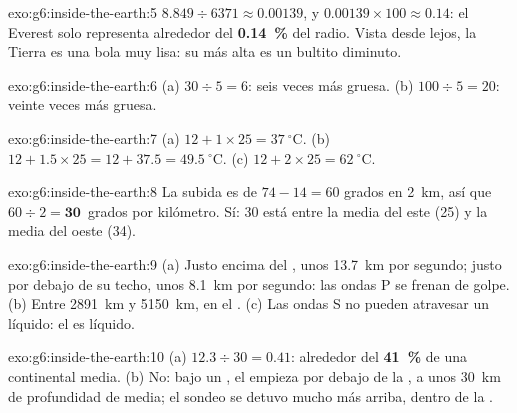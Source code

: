 \begin{solution}{exo:g6:inside-the-earth:5}
$8.849 \div 6371 \approx 0.00139$, y $0.00139 \times 100 \approx 0.14$: el
Everest solo representa alrededor del \textbf{0.14~\%} del radio. Vista
desde lejos, la Tierra es una bola muy lisa: su  más alta es un
bultito diminuto.
\end{solution}

\begin{solution}{exo:g6:inside-the-earth:6}
(a) $30 \div 5 = 6$: seis veces más gruesa. (b) $100 \div 5 = 20$: veinte
veces más gruesa.
\end{solution}

\begin{solution}{exo:g6:inside-the-earth:7}
(a) $12 + 1 \times 25 = 37~^\circ$C. (b) $12 + 1.5 \times 25 = 12 + 37.5 =
49.5~^\circ$C. (c) $12 + 2 \times 25 = 62~^\circ$C.
\end{solution}

\begin{solution}{exo:g6:inside-the-earth:8}
La subida es de $74 - 14 = 60$ grados en 2~km, así que $60 \div 2 =
\textbf{30}$~grados por kilómetro. Sí: 30 está entre la media del este (25)
y la media del oeste (34).
\end{solution}

\begin{solution}{exo:g6:inside-the-earth:9}
(a) Justo encima del , unos 13.7~km por segundo; justo por debajo de
su techo, unos 8.1~km por segundo: las ondas P se frenan de golpe.
(b) Entre 2891~km y 5150~km, en el . (c) Las ondas S no
pueden atravesar un líquido: el  es líquido.
\end{solution}

\begin{solution}{exo:g6:inside-the-earth:10}
(a) $12.3 \div 30 = 0.41$: alrededor del \textbf{41~\%} de una 
continental media. (b) No: bajo un , el  empieza por debajo
de la , a unos 30~km de profundidad de media; el sondeo se detuvo
mucho más arriba, dentro de la .
\end{solution}

